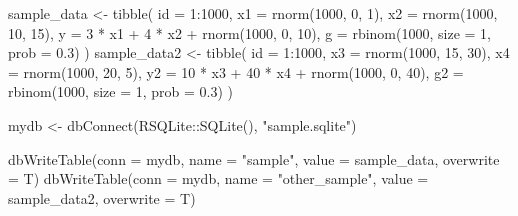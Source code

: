 \documentclass[
  letterpaper,
  DIV=11,
  numbers=noendperiod]{scrreprt}
\newenvironment{Shaded}{\begin{snugshade}}{\end{snugshade}}
\newcommand{\AttributeTok}[1]{\textcolor[rgb]{0.40,0.45,0.13}{#1}}
\newcommand{\DecValTok}[1]{\textcolor[rgb]{0.68,0.00,0.00}{#1}}
\newcommand{\FloatTok}[1]{\textcolor[rgb]{0.68,0.00,0.00}{#1}}
\newcommand{\FunctionTok}[1]{\textcolor[rgb]{0.28,0.35,0.67}{#1}}
\newcommand{\NormalTok}[1]{\textcolor[rgb]{0.00,0.23,0.31}{#1}}
\newcommand{\OtherTok}[1]{\textcolor[rgb]{0.00,0.23,0.31}{#1}}
\newcommand{\SpecialCharTok}[1]{\textcolor[rgb]{0.37,0.37,0.37}{#1}}
\newcommand{\StringTok}[1]{\textcolor[rgb]{0.13,0.47,0.30}{#1}}
\begin{document}
\begin{Shaded}
\begin{Highlighting}[]
\NormalTok{sample\_data }\OtherTok{\textless{}{-}} \FunctionTok{tibble}\NormalTok{(}
  \AttributeTok{id =} \DecValTok{1}\SpecialCharTok{:}\DecValTok{1000}\NormalTok{,}
  \AttributeTok{x1 =} \FunctionTok{rnorm}\NormalTok{(}\DecValTok{1000}\NormalTok{, }\DecValTok{0}\NormalTok{, }\DecValTok{1}\NormalTok{),}
  \AttributeTok{x2 =} \FunctionTok{rnorm}\NormalTok{(}\DecValTok{1000}\NormalTok{, }\DecValTok{10}\NormalTok{, }\DecValTok{15}\NormalTok{),}
  \AttributeTok{y =} \DecValTok{3} \SpecialCharTok{*}\NormalTok{ x1 }\SpecialCharTok{+} \DecValTok{4} \SpecialCharTok{*}\NormalTok{ x2 }\SpecialCharTok{+} \FunctionTok{rnorm}\NormalTok{(}\DecValTok{1000}\NormalTok{, }\DecValTok{0}\NormalTok{, }\DecValTok{10}\NormalTok{),}
  \AttributeTok{g =} \FunctionTok{rbinom}\NormalTok{(}\DecValTok{1000}\NormalTok{, }\AttributeTok{size =} \DecValTok{1}\NormalTok{, }\AttributeTok{prob =} \FloatTok{0.3}\NormalTok{)}
\NormalTok{)}
\NormalTok{sample\_data2 }\OtherTok{\textless{}{-}} \FunctionTok{tibble}\NormalTok{(}
  \AttributeTok{id =} \DecValTok{1}\SpecialCharTok{:}\DecValTok{1000}\NormalTok{,}
  \AttributeTok{x3 =} \FunctionTok{rnorm}\NormalTok{(}\DecValTok{1000}\NormalTok{, }\DecValTok{15}\NormalTok{, }\DecValTok{30}\NormalTok{),}
  \AttributeTok{x4 =} \FunctionTok{rnorm}\NormalTok{(}\DecValTok{1000}\NormalTok{, }\DecValTok{20}\NormalTok{, }\DecValTok{5}\NormalTok{),}
  \AttributeTok{y2 =} \DecValTok{10} \SpecialCharTok{*}\NormalTok{ x3 }\SpecialCharTok{+} \DecValTok{40} \SpecialCharTok{*}\NormalTok{ x4 }\SpecialCharTok{+} \FunctionTok{rnorm}\NormalTok{(}\DecValTok{1000}\NormalTok{, }\DecValTok{0}\NormalTok{, }\DecValTok{40}\NormalTok{),}
  \AttributeTok{g2 =} \FunctionTok{rbinom}\NormalTok{(}\DecValTok{1000}\NormalTok{, }\AttributeTok{size =} \DecValTok{1}\NormalTok{, }\AttributeTok{prob =} \FloatTok{0.3}\NormalTok{)}
\NormalTok{)}

\NormalTok{mydb }\OtherTok{\textless{}{-}} \FunctionTok{dbConnect}\NormalTok{(RSQLite}\SpecialCharTok{::}\FunctionTok{SQLite}\NormalTok{(), }\StringTok{"sample.sqlite"}\NormalTok{)}

\FunctionTok{dbWriteTable}\NormalTok{(}\AttributeTok{conn =}\NormalTok{ mydb, }\AttributeTok{name =} \StringTok{"sample"}\NormalTok{, }\AttributeTok{value =}\NormalTok{ sample\_data, }\AttributeTok{overwrite =}\NormalTok{ T)}
\FunctionTok{dbWriteTable}\NormalTok{(}\AttributeTok{conn =}\NormalTok{ mydb, }\AttributeTok{name =} \StringTok{"other\_sample"}\NormalTok{, }\AttributeTok{value =}\NormalTok{ sample\_data2, }\AttributeTok{overwrite =}\NormalTok{ T)}


\end{Highlighting}
\end{Shaded}
\end{document}
